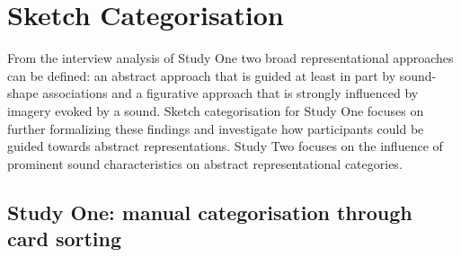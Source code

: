 \documentclass[]{interact}
\theoremstyle{plain}%
\theoremstyle{definition}
\theoremstyle{remark}
\begin{document}
\section{Sketch Categorisation}\label{sec:sketch_categorisation}
From the interview analysis of Study One two broad representational approaches can be defined: an abstract approach that is guided at least in part by sound-shape associations and a figurative approach that is strongly influenced by imagery evoked by a sound. Sketch categorisation for Study One focuses on further formalizing these findings and investigate how participants could be guided towards abstract representations. Study Two focuses on the influence of prominent sound characteristics on abstract representational categories. 

\subsection{Study One: manual categorisation through card sorting}\label{subsec:categorisation_one}
\end{document}

